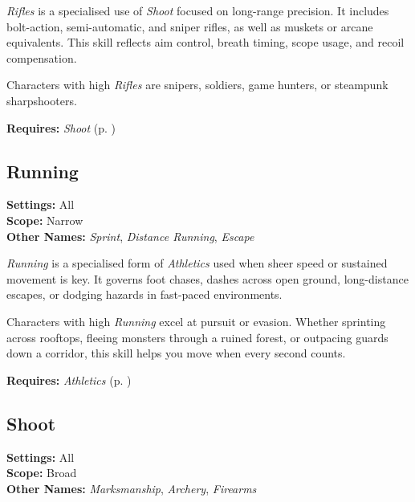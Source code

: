 \emph{Rifles} is a specialised use of \emph{Shoot} focused on long-range precision. It includes bolt-action, semi-automatic, and sniper rifles, as well as muskets or arcane equivalents. This skill reflects aim control, breath timing, scope usage, and recoil compensation.

Characters with high \emph{Rifles} are snipers, soldiers, game hunters, or steampunk sharpshooters.

\vspace{0.5\baselineskip}
\noindent\textbf{Requires:} \emph{Shoot} (p. \pageref{skill:shoot})





\subsection{Running}\label{skill:running}
\textbf{Settings:} All\\
\textbf{Scope:} Narrow\\
\textbf{Other Names:} \emph{Sprint}, \emph{Distance Running}, \emph{Escape}\\
\vspace{\baselineskip}

\emph{Running} is a specialised form of \emph{Athletics} used when sheer speed or sustained movement is key. It governs foot chases, dashes across open ground, long-distance escapes, or dodging hazards in fast-paced environments.

Characters with high \emph{Running} excel at pursuit or evasion. Whether sprinting across rooftops, fleeing monsters through a ruined forest, or outpacing guards down a corridor, this skill helps you move when every second counts.

\vspace{0.5\baselineskip}
\noindent\textbf{Requires:} \emph{Athletics} (p. \pageref{skill:athletics})



\subsection{Shoot}\label{skill:shoot}
\textbf{Settings:} All\\
\textbf{Scope:} Broad\\
\textbf{Other Names:} \emph{Marksmanship}, \emph{Archery}, \emph{Firearms}\\
\vspace{\baselineskip}

